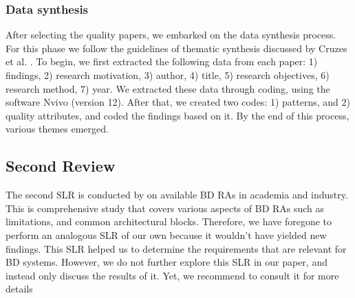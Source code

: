 \documentclass{bmcart}
\begin{document}
\subsubsection{Data synthesis}

After selecting the quality papers, we embarked on the data synthesis process. For this phase we follow the guidelines of thematic synthesis discussed by Cruzes et al. \cite{Cruzes.2011}. To begin, we first extracted the following data from each paper: 1) findings, 2) research motivation, 3) author, 4) title, 5) research objectives, 6) research method, 7) year. We extracted these data through coding, using the software Nvivo (version 12). After that, we created two codes: 1) patterns, and 2) quality attributes, and coded the findings based on it. By the end of this process, various themes emerged.



 



\subsection{Second Review} \label{secondReview}

The second SLR is conducted by \cite{ataei2022state} on available BD RAs in academia and industry. This is comprehensive study that covers various aspects of BD RAs such as limitations, and common architectural blocks. Therefore, we have foregone to perform an analogous SLR of our own because it wouldn't have yielded new findings.  This SLR helped us to determine the requirements that are relevant for BD systems. However, we do not further explore this SLR in our paper, and instead only discuss the results of it. Yet, we recommend to consult it for more details


\end{document}
